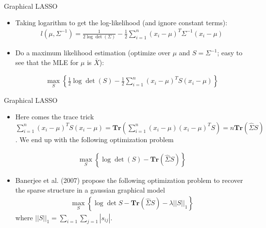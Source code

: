 \documentclass[12pt, trans]{beamer}
\newcommand{\1}[1]{{\mathbf 1}\left\{#1\right\}}        %
\def\lp{\left(}
\def\rp{\right)}
\begin{document}
\begin{frame}[fragile]{Graphical LASSO}

\begin{itemize}[<+->]
\item  Taking logarithm to get the log-likelihood (and ignore constant terms):
\begin{align*}
l(\mu,\Sigma^{-1}) = \frac{1}{2\log \det \lp \Sigma \rp}  -\frac{1}{2} \sum_{i=1}^n(x_i-\mu)^T\Sigma^{-1}(x_i-\mu)
\end{align*}

\item Do a maximum likelihood estimation (optimize over $\mu$ and $S = \Sigma^{-1}$; easy to see that the MLE for $\mu$ is $\bar{X}$):

\begin{align*}
\max_S\left\{  \frac{1}{2}\log \det\lp S \rp  -\frac{1}{2} \sum_{i=1}^n(x_i-\mu)^T S (x_i-\mu)\right\} 
\end{align*}


\end{itemize}

\end{frame}

\begin{frame}[fragile]{Graphical LASSO}

\begin{itemize}[<+->]
\item  Here comes the trace trick $\sum_{i=1}^n(x_i-\mu)^T S (x_i-\mu) = \textbf{Tr} (\sum_{i=1}^n (x_i-\mu)(x_i-\mu)^TS) = n\textbf{Tr}(\hat{\Sigma}S)$. We end up with the following optimization problem

\begin{align*}
\max_S \left\{  \log \det \lp S\rp - \textbf{Tr}\lp \hat{\Sigma}S \rp  \right\}
\end{align*}

\item Banerjee et al. (2007) propose the following optimization problem to recover the sparse structure in a gaussian graphical model
\begin{align*}
\max_S \left\{ \log \det S - \textbf{Tr} \lp \hat{\Sigma}S \rp - \lambda ||S||_1 \right\}
\end{align*}
where $||S||_1 = \sum_{i=1}\sum_{j=1} |s_{ij}|$.

\end{itemize}

\end{frame}
\end{document}
